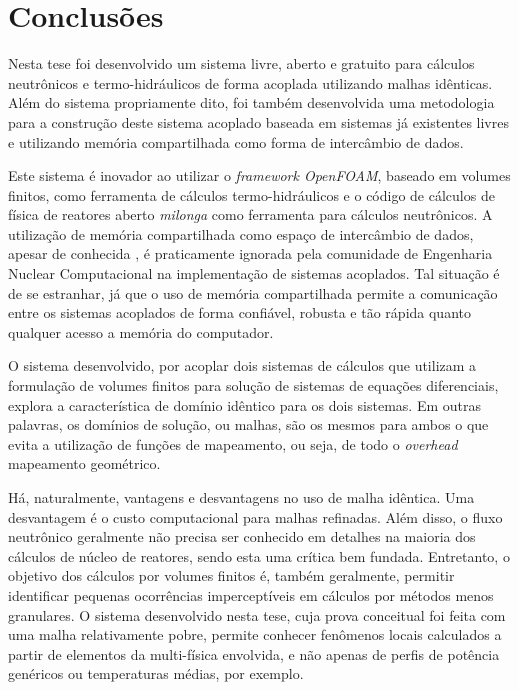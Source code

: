 \chapter{Conclusões}
\label{chap:conclusoes}

Nesta tese foi desenvolvido um sistema livre, aberto e gratuito para
cálculos neutrônicos e termo-hidráulicos de forma acoplada utilizando
malhas idênticas. Além do sistema propriamente dito, foi também desenvolvida
uma metodologia para a construção deste sistema acoplado baseada em sistemas
já existentes livres e utilizando memória compartilhada como forma de
intercâmbio de dados.

Este sistema é inovador ao utilizar o \textit{framework OpenFOAM}, baseado
em volumes finitos, como ferramenta de cálculos termo-hidráulicos e o
código de cálculos de física de reatores aberto \textit{milonga} como ferramenta
para cálculos neutrônicos. A utilização de memória compartilhada como
espaço de intercâmbio de dados, apesar de conhecida \cite{Maciel2011, Theler2013},
é praticamente ignorada pela comunidade de Engenharia Nuclear Computacional na
implementação de sistemas acoplados. Tal situação é de se estranhar, já que o
uso de memória compartilhada permite a comunicação entre os sistemas acoplados
de forma confiável, robusta e tão rápida quanto qualquer acesso a memória
do computador.

O sistema desenvolvido, por acoplar dois sistemas de cálculos que utilizam
a formulação de volumes finitos para solução de sistemas de equações diferenciais,
explora a característica de domínio idêntico para os dois sistemas. Em outras palavras,
os domínios de solução, ou malhas, são os mesmos para ambos o que evita a utilização
de funções de mapeamento, ou seja, de todo o \textit{overhead} mapeamento geométrico.

Há, naturalmente, vantagens e desvantagens no uso de malha idêntica. Uma desvantagem
é o custo computacional para malhas refinadas. Além disso, o fluxo neutrônico geralmente
não precisa ser conhecido em detalhes na maioria dos cálculos de núcleo de reatores,
sendo esta uma crítica bem fundada. Entretanto, o objetivo dos cálculos por volumes
finitos é, também geralmente, permitir identificar pequenas ocorrências imperceptíveis
em cálculos por métodos menos granulares. O sistema desenvolvido nesta tese, cuja
prova conceitual foi feita com uma malha relativamente pobre, permite conhecer fenômenos
locais calculados a partir de elementos da multi-física envolvida, e não apenas
de perfis de potência genéricos ou temperaturas médias, por exemplo.

